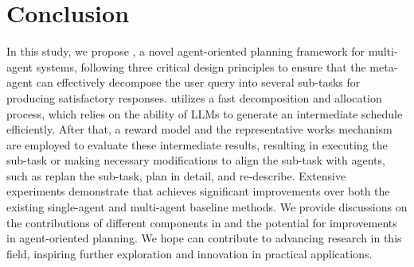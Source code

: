 \section{Conclusion}


In this study, we propose \name, a novel agent-oriented planning framework for multi-agent systems, following three critical design principles to ensure that the meta-agent can effectively decompose the user query into several sub-tasks for producing satisfactory responses.
\name utilizes a fast decomposition and allocation process, which relies on the ability of LLMs to generate an intermediate schedule efficiently. After that, a reward model and the representative works mechanism are employed to evaluate these intermediate results, resulting in executing the sub-task or making necessary modifications to align the sub-task with agents, such as replan the sub-task, plan in detail, and re-describe.
Extensive experiments demonstrate that \name achieves significant improvements over both the existing single-agent and multi-agent baseline methods.
We provide discussions on the contributions of different components in \name and the potential for improvements in agent-oriented planning.
We hope \name can contribute to advancing research in this field, inspiring further exploration and innovation in practical applications.
